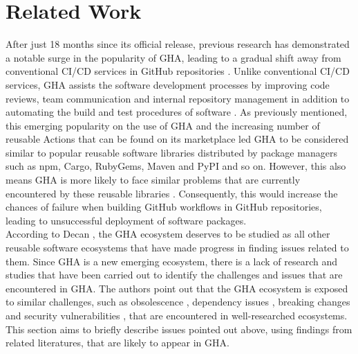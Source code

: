 \documentclass[conference]{IEEEtran}
\begin{document}
\section{Related Work}
    After just 18 months since its official release, previous research has demonstrated a notable surge in the popularity of GHA, leading to a gradual shift away from conventional CI/CD services in GitHub repositories \cite{golzadeh2021rise}. Unlike conventional CI/CD services, GHA assists the software development processes by improving code reviews, team communication and internal repository management in addition to automating the build and test procedures of software \cite{chandrasekara2021hands}. As previously mentioned, this emerging popularity on the use of GHA and the increasing number of reusable Actions that can be found on its marketplace led GHA to be considered similar to popular reusable software libraries distributed by package managers such as npm, Cargo, RubyGems, Maven and PyPI and so on. However, this also means GHA is more likely to face similar problems that are currently encountered by these reusable libraries \cite{decan2022use}. Consequently, this would increase the chances of failure when building GitHub workflows in GitHub repositories, leading to unsuccessful deployment of software packages. \\
    According to Decan \cite{decan2022use}, the GHA ecosystem deserves to be studied as all other reusable software ecosystems that have made progress in finding issues related to them. Since GHA is a new emerging ecosystem, there is a lack of research and studies that have been carried out to identify the challenges and issues that are encountered in GHA. The authors point out that the GHA ecosystem is exposed to similar challenges, such as obsolescence \cite{decan2018evolution} \cite{cogo2021deprecation}, dependency issues \cite{decan2019empirical} \cite{soto2021comprehensive} \cite{decan2019package}, breaking changes \cite{dietrich2019dependency}\cite{decan2018impact} and security vulnerabilities \cite{zimmermann2019small} \cite{kula2018developers}, that are encountered in well-researched ecosystems. This section aims to briefly describe issues pointed out above, using findings from related literatures, that are likely to appear in GHA.
\end{document}
